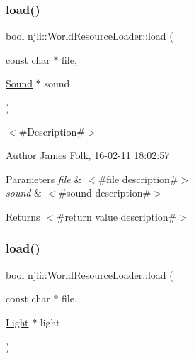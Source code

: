 \subsubsection{\texorpdfstring{load()}{load()}\hspace{0.1cm}{\footnotesize\ttfamily [4/13]}}
{\footnotesize\ttfamily bool njli\+::\+World\+Resource\+Loader\+::load (\begin{DoxyParamCaption}\item[{const char $\ast$}]{file,  }\item[{\mbox{\hyperlink{classnjli_1_1_sound}{Sound}} $\ast$}]{sound }\end{DoxyParamCaption})}



$<$\#\+Description\#$>$ 

\begin{DoxyAuthor}{Author}
James Folk, 16-\/02-\/11 18\+:02\+:57
\end{DoxyAuthor}

\begin{DoxyParams}{Parameters}
{\em file} & $<$\#file description\#$>$ \\
\hline
{\em sound} & $<$\#sound description\#$>$\\
\hline
\end{DoxyParams}
\begin{DoxyReturn}{Returns}
$<$\#return value description\#$>$ 
\end{DoxyReturn}
\mbox{\label{classnjli_1_1_world_resource_loader_a5e5f9156810ac9bad5e76a81868f29d8}} 
\subsubsection{\texorpdfstring{load()}{load()}\hspace{0.1cm}{\footnotesize\ttfamily [5/13]}}
{\footnotesize\ttfamily bool njli\+::\+World\+Resource\+Loader\+::load (\begin{DoxyParamCaption}\item[{const char $\ast$}]{file,  }\item[{\mbox{\hyperlink{classnjli_1_1_light}{Light}} $\ast$}]{light }\end{DoxyParamCaption})}




